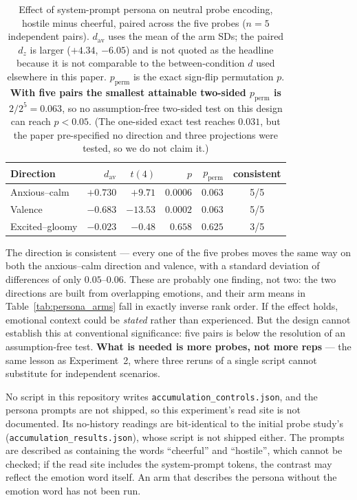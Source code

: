 \documentclass[11pt,a4paper]{article}
\begin{document}
\begin{table}[H]
\centering
\caption{Effect of system-prompt persona on neutral probe encoding, hostile
minus cheerful, paired across the five probes ($n{=}5$ independent pairs).
$d_{\mathrm{av}}$ uses the mean of the arm SDs; the paired $d_z$ is larger
($+4.34$, $-6.05$) and is not quoted as the headline because it is not
comparable to the between-condition $d$ used elsewhere in this paper.
$p_{\text{perm}}$ is the exact sign-flip permutation $p$. \textbf{With five
pairs the smallest attainable two-sided $p_{\text{perm}}$ is $2/2^5 = 0.063$},
so no assumption-free two-sided test on this design can reach $p{<}0.05$. (The one-sided exact test reaches $0.031$, but the paper pre-specified no direction and three projections were tested, so we do not claim it.)}
\label{tab:persona}
\begin{tabular}{lrrrrc}
\toprule
Direction & $d_{\mathrm{av}}$ & $t(4)$ & $p$ & $p_{\text{perm}}$ & consistent \\
\midrule
Anxious--calm & $+0.730$ & $+9.71$ & $0.0006$ & $0.063$ & 5/5 \\
Valence & $-0.683$ & $-13.53$ & $0.0002$ & $0.063$ & 5/5 \\
Excited--gloomy & $-0.023$ & $-0.48$ & $0.658$ & $0.625$ & 3/5 \\
\bottomrule
\end{tabular}
\end{table}

The direction is consistent --- every one of the five probes moves the same way
on both the anxious--calm direction and valence, with a standard deviation of
differences of only $0.05$--$0.06$. These are probably one finding, not two: the
two directions are built from overlapping emotions, and their arm means in
Table~\ref{tab:persona_arms} fall in exactly inverse rank order. If the
effect holds, emotional context could be \emph{stated} rather than
experienced. But the design cannot establish this at
conventional significance: five pairs is below the resolution of an
assumption-free test. \textbf{What is needed is more probes, not more reps} ---
the same lesson as Experiment~2, where three reruns of a single script cannot
substitute for independent scenarios.

No script in this repository writes \texttt{accumulation\_controls.json},
and the persona prompts are not shipped, so this experiment's read site
is not documented. Its no-history readings are bit-identical to the
initial probe study's (\texttt{accumulation\_results.json}), whose script
is not shipped either. The prompts are described as containing the words
``cheerful'' and ``hostile'', which cannot be checked; if the read site
includes the system-prompt tokens, the
contrast may reflect the emotion word itself. An arm that describes the
persona without the emotion word has not been run.
\end{document}
